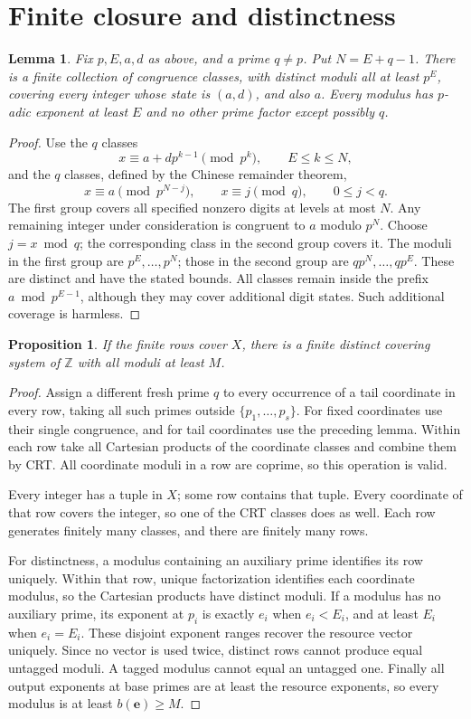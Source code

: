 \documentclass[11pt]{article}
\newtheorem{proposition}{Proposition}
\newtheorem{lemma}{Lemma}
\newcommand{\Z}{\mathbb Z}
\begin{document}
\section{Finite closure and distinctness}
\begin{lemma}
Fix $p,E,a,d$ as above, and a prime $q\ne p$. Put $N=E+q-1$.
There is a finite collection of congruence classes, with distinct moduli all
at least $p^E$, covering every integer whose state is $(a,d)$, and also $a$.
Every modulus has $p$-adic exponent at least $E$ and no other prime factor
except possibly $q$.
\end{lemma}
\begin{proof}
Use the $q$ classes
\[
 x\equiv a+d p^{k-1}\pmod {p^k},\qquad E\leq k\leq N,
\]
and the $q$ classes, defined by the Chinese remainder theorem,
\[
 x\equiv a\pmod {p^{N-j}},\qquad x\equiv j\pmod q,
 \qquad 0\leq j<q.
\]
The first group covers all specified nonzero digits at levels at most $N$.
Any remaining integer under consideration is congruent to $a$ modulo $p^N$.
Choose $j=x\bmod q$; the corresponding class in the second group covers it.
The moduli in the first group are $p^E,\ldots,p^N$; those in the second
group are $qp^N,\ldots,qp^E$. These are distinct and have the stated bounds.
All classes remain inside the prefix $a\bmod p^{E-1}$, although they may
cover additional digit states. Such additional coverage is harmless.
\end{proof}

\begin{proposition}\label{prop:construction}
If the finite rows cover $X$, there is a finite distinct covering system
of $\Z$ with all moduli at least $M$.
\end{proposition}
\begin{proof}
Assign a different fresh prime $q$ to every occurrence of a tail coordinate
in every row, taking all such primes outside $\{p_1,\ldots,p_s\}$.
For fixed coordinates use their single congruence, and for tail coordinates
use the preceding lemma. Within each row take all Cartesian products of the
coordinate classes and combine them by CRT. All coordinate moduli in a row
are coprime, so this operation is valid.

Every integer has a tuple in $X$; some row contains that tuple. Every
coordinate of that row covers the integer, so one of the CRT classes does
as well. Each row generates finitely many classes, and there are finitely
many rows.

For distinctness, a modulus containing an auxiliary prime identifies its
row uniquely. Within that row, unique factorization identifies each coordinate
modulus, so the Cartesian products have distinct moduli. If a modulus has no
auxiliary prime, its exponent at $p_i$ is exactly $e_i$ when $e_i<E_i$, and
at least $E_i$ when $e_i=E_i$. These disjoint exponent ranges recover the
resource vector uniquely. Since no vector is used twice, distinct rows cannot
produce equal untagged moduli. A tagged modulus cannot equal an untagged one.
Finally all output exponents at base primes are at least the resource
exponents, so every modulus is at least $b(\mathbf e)\geq M$.
\end{proof}
\end{document}
